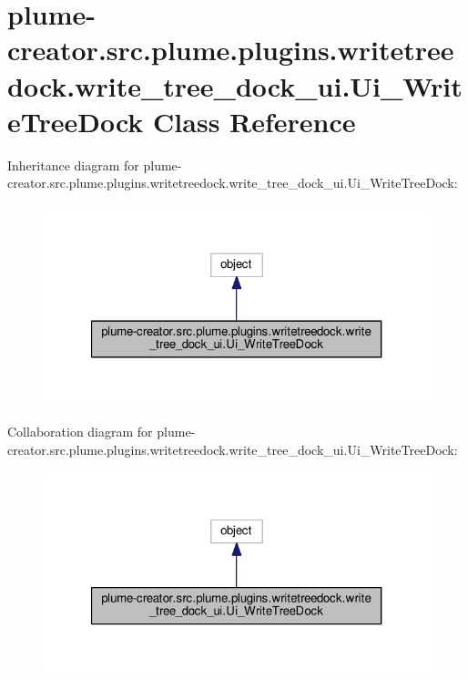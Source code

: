 \hypertarget{classplume-creator_1_1src_1_1plume_1_1plugins_1_1writetreedock_1_1write__tree__dock__ui_1_1_ui___write_tree_dock}{}\section{plume-\/creator.src.\+plume.\+plugins.\+writetreedock.\+write\+\_\+tree\+\_\+dock\+\_\+ui.\+Ui\+\_\+\+Write\+Tree\+Dock Class Reference}
\label{classplume-creator_1_1src_1_1plume_1_1plugins_1_1writetreedock_1_1write__tree__dock__ui_1_1_ui___write_tree_dock}


Inheritance diagram for plume-\/creator.src.\+plume.\+plugins.\+writetreedock.\+write\+\_\+tree\+\_\+dock\+\_\+ui.\+Ui\+\_\+\+Write\+Tree\+Dock\+:\nopagebreak
\begin{figure}[H]
\begin{center}
\leavevmode
\includegraphics[width=321pt]{classplume-creator_1_1src_1_1plume_1_1plugins_1_1writetreedock_1_1write__tree__dock__ui_1_1_ui__1dc2ab647ea2cbe063626254e7338264}
\end{center}
\end{figure}


Collaboration diagram for plume-\/creator.src.\+plume.\+plugins.\+writetreedock.\+write\+\_\+tree\+\_\+dock\+\_\+ui.\+Ui\+\_\+\+Write\+Tree\+Dock\+:\nopagebreak
\begin{figure}[H]
\begin{center}
\leavevmode
\includegraphics[width=321pt]{classplume-creator_1_1src_1_1plume_1_1plugins_1_1writetreedock_1_1write__tree__dock__ui_1_1_ui___write_tree_dock__coll__graph}
\end{center}
\end{figure}

